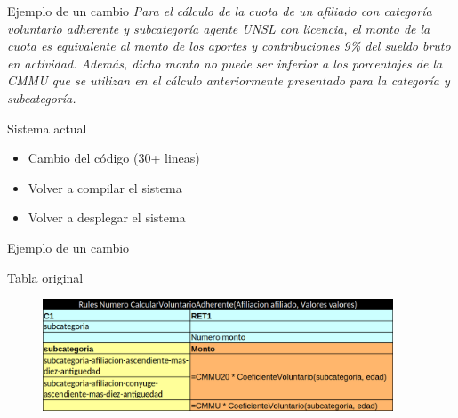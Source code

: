 \documentclass[10pt]{beamer}
\begin{document}
\begin{frame}{Ejemplo de un cambio}
    \emph{
    Para el cálculo de la cuota de un afiliado con categoría voluntario adherente y subcategoría agente UNSL con licencia, el monto de la cuota es equivalente al monto de los aportes y contribuciones 9\% del sueldo bruto en actividad. Además, dicho monto no puede ser inferior a los porcentajes de la CMMU que se utilizan en el cálculo anteriormente presentado para la categoría y subcategoría.
    }
    \begin{block}{Sistema actual}
        \begin{itemize}
            \item Cambio del código (30+ lineas)
            \item Volver a compilar el sistema
            \item Volver a desplegar el sistema
        \end{itemize}
    \end{block}
\end{frame}

\begin{frame}{Ejemplo de un cambio}
    \begin{block}{Tabla original}
        \begin{figure}
            \centering
            \includegraphics[width=0.93\textwidth]{tables/voluntario.png}
        \end{figure}
    \end{block}
\end{frame}

\end{document}
